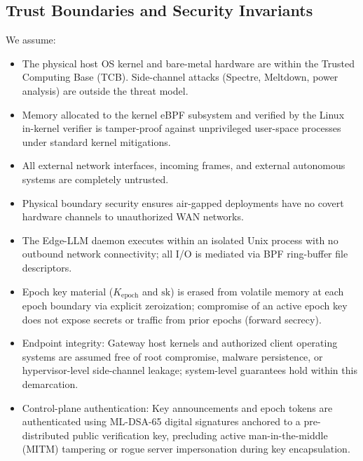 \documentclass{ieeeaccess}
\renewcommand{\_}{\textunderscore\allowbreak}
\begin{document}
\subsection{Trust Boundaries and Security Invariants}
We assume:
\begin{itemize}
  \item The physical host OS kernel and bare-metal hardware are within the Trusted
    Computing Base (TCB). Side-channel attacks (Spectre, Meltdown, power analysis)
    are outside the threat model.

  \item Memory allocated to the kernel eBPF subsystem and verified by the Linux
    in-kernel verifier is tamper-proof against unprivileged user-space processes
    under standard kernel mitigations.

  \item All external network interfaces, incoming frames, and external autonomous
    systems are completely untrusted.

  \item Physical boundary security ensures air-gapped deployments have no covert
    hardware channels to unauthorized WAN networks.

  \item The Edge-LLM daemon executes within an isolated Unix process with no
    outbound network connectivity; all I/O is mediated via BPF ring-buffer file
    descriptors.

  \item Epoch key material ($K_{\text{epoch}}$ and $\text{sk}$) is erased from
    volatile memory at each epoch boundary via explicit zeroization; compromise
    of an active epoch key does not expose secrets or traffic from prior epochs
    (forward secrecy).

  \item Endpoint integrity: Gateway host kernels and authorized client operating
    systems are assumed free of root compromise, malware persistence, or
    hypervisor-level side-channel leakage; system-level guarantees hold within this
    demarcation.

  \item Control-plane authentication: Key announcements and epoch tokens are
    authenticated using ML-DSA-65 digital signatures anchored to a pre-distributed
    public verification key, precluding active man-in-the-middle (MITM) tampering
    or rogue server impersonation during key encapsulation.
\end{itemize}
\end{document}
